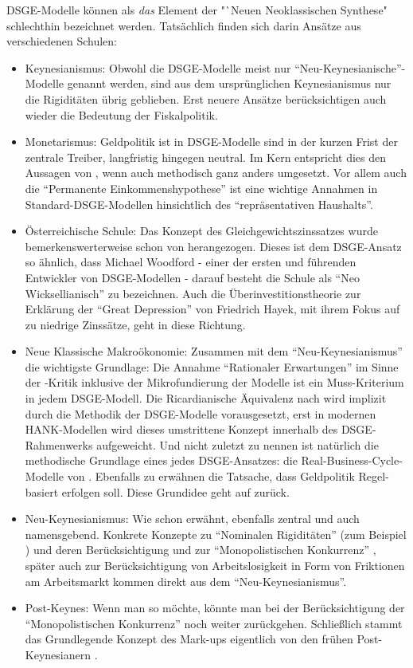 DSGE-Modelle können als \textit{das} Element der "`Neuen Neoklassischen Synthese" schlechthin bezeichnet werden. Tatsächlich finden sich darin Ansätze aus verschiedenen Schulen:
\begin{itemize}
	\item Keynesianismus: Obwohl die DSGE-Modelle meist nur "`Neu-Keynesianische"'-Modelle genannt werden, sind aus dem ursprünglichen Keynesianismus nur die Rigiditäten übrig geblieben. Erst neuere Ansätze \parencite{Kaplan2018} berücksichtigen auch wieder die Bedeutung der Fiskalpolitik.
	\item Monetarismus: Geldpolitik ist in DSGE-Modelle sind in der kurzen Frist der zentrale Treiber, langfristig hingegen neutral. Im Kern entspricht dies den Aussagen von \textcite{Friedman1968}, wenn auch methodisch ganz anders umgesetzt. Vor allem auch die "`Permanente Einkommenshypothese"' ist eine wichtige Annahmen in Standard-DSGE-Modellen hinsichtlich des "`repräsentativen Haushalts"'.
	\item Österreichische Schule: Das Konzept des Gleichgewichtszinssatzes wurde bemerkenswerterweise schon von \textcite{Wicksel1898} herangezogen. Dieses ist dem DSGE-Ansatz so ähnlich, dass Michael Woodford - einer der ersten und führenden Entwickler von DSGE-Modellen - darauf besteht die Schule als "`Neo Wicksellianisch"' zu bezeichnen. Auch die Überinvestitionstheorie zur Erklärung der "`Great Depression"' von Friedrich Hayek, mit ihrem Fokus auf zu niedrige Zinssätze, geht in diese Richtung.
	\item Neue Klassische Makroökonomie: Zusammen mit dem "`Neu-Keynesianismus"' die wichtigste Grundlage: Die Annahme "`Rationaler Erwartungen"' im Sinne der \textcite{Lucas1976}-Kritik inklusive der Mikrofundierung der Modelle ist ein Muss-Kriterium in jedem DSGE-Modell. Die Ricardianische Äquivalenz nach \textcite{Barro1974} wird implizit durch die Methodik der DSGE-Modelle vorausgesetzt, erst in modernen HANK-Modellen wird dieses umstrittene Konzept innerhalb des DSGE-Rahmenwerks aufgeweicht. Und nicht zuletzt zu nennen ist natürlich die methodische Grundlage eines jedes DSGE-Ansatzes: die Real-Business-Cycle-Modelle von \textcite{Kydland1982}. Ebenfalls zu erwähnen die Tatsache, dass Geldpolitik Regel-basiert erfolgen soll. Diese Grundidee geht auf \textcite{Kydland1977} zurück.	
	\item Neu-Keynesianismus: Wie schon erwähnt, ebenfalls zentral und auch namensgebend. Konkrete Konzepte zu "`Nominalen Rigiditäten"' (zum Beispiel \textcite{Akerlof1985, Mankiw1985b}) und deren Berücksichtigung \parencite{Calvo1983} und zur "`Monopolistischen Konkurrenz"' \parencite{Blanchard1987}, später auch zur Berücksichtigung von Arbeitslosigkeit in Form von Friktionen am Arbeitsmarkt \parencite{MortensenPissarides1994} kommen direkt aus dem "`Neu-Keynesianismus"'.
	\item Post-Keynes: Wenn man so möchte, könnte man bei der Berücksichtigung der "`Monopolistischen Konkurrenz"' noch weiter zurückgehen. Schließlich stammt das Grundlegende Konzept des Mark-ups eigentlich von den frühen Post-Keynesianern \parencite{Robinson1933}.
\end{itemize}

